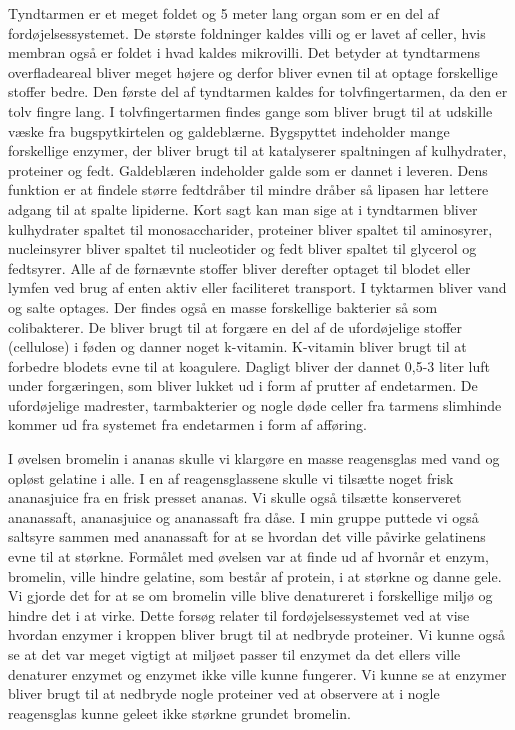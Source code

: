 Tyndtarmen er et meget foldet og 5 meter lang organ som er en del af fordøjelsessystemet. De største foldninger kaldes villi og er lavet af celler, hvis membran også er foldet i hvad kaldes mikrovilli. Det betyder at tyndtarmens overfladeareal bliver meget højere og derfor bliver evnen til at optage forskellige stoffer bedre. Den første del af tyndtarmen kaldes for tolvfingertarmen, da den er tolv fingre lang. I tolvfingertarmen findes gange som bliver brugt til at udskille væske fra bugspytkirtelen og galdeblærne. Bygspyttet indeholder mange forskellige enzymer, der bliver brugt til at katalyserer spaltningen af kulhydrater, proteiner og fedt. Galdeblæren indeholder galde som er dannet i leveren. Dens funktion er at findele større fedtdråber til mindre dråber så lipasen har lettere adgang til at spalte lipiderne. Kort sagt kan man sige at i tyndtarmen bliver kulhydrater spaltet til monosaccharider, proteiner bliver spaltet til aminosyrer, nucleinsyrer bliver spaltet til nucleotider og fedt bliver spaltet til glycerol og fedtsyrer. Alle af de førnævnte stoffer bliver derefter optaget til blodet eller lymfen ved brug af enten aktiv eller faciliteret transport.
I tyktarmen bliver vand og salte optages. Der findes også en masse forskellige bakterier så som colibakterer. De bliver brugt til at forgære en del af de ufordøjelige stoffer (cellulose) i føden og danner noget k-vitamin. K-vitamin bliver brugt til at forbedre blodets evne til at koagulere. Dagligt bliver der dannet 0,5-3 liter luft under forgæringen, som bliver lukket ud i form af prutter af endetarmen. De ufordøjelige madrester, tarmbakterier og nogle døde celler fra tarmens slimhinde kommer ud fra systemet fra endetarmen i form af afføring.

I øvelsen bromelin i ananas skulle vi klargøre en masse reagensglas med vand og opløst gelatine i alle. I en af reagensglassene skulle vi tilsætte noget frisk ananasjuice fra en frisk presset ananas. Vi skulle også tilsætte konserveret ananassaft, ananasjuice og ananassaft fra dåse. I min gruppe puttede vi også saltsyre sammen med ananassaft for at se hvordan det ville påvirke gelatinens evne til at størkne. Formålet med øvelsen var at finde ud af hvornår et enzym, bromelin, ville hindre gelatine, som består af protein, i at størkne og danne gele. Vi gjorde det for at se om bromelin ville blive denatureret i forskellige miljø og hindre det i at virke.
Dette forsøg relater til fordøjelsessystemet ved at vise hvordan enzymer i kroppen bliver brugt til at nedbryde proteiner. Vi kunne også se at det var meget vigtigt at miljøet passer til enzymet da det ellers ville denaturer enzymet og enzymet ikke ville kunne fungerer. Vi kunne se at enzymer bliver brugt til at nedbryde nogle proteiner ved at observere at i nogle reagensglas kunne geleet ikke størkne grundet bromelin.

